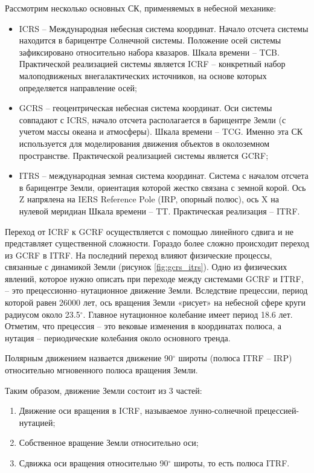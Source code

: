 Рассмотрим несколько основных СК, применяемых в небесной механике:
\begin{itemize}
    \item ICRS -- Международная небесная система координат. Начало отсчета системы находится
    в барицентре Солнечной системы. Положение осей системы зафиксировано относительно набора
    квазаров. Шкала времени -- TСB. Практической реализацией системы является ICRF -- конкретный набор
    малоподвиженых внегалактических источников, на основе которых определяется направление осей;
    \item GCRS -- геоцентрическая небесная система координат.
    Оси системы совпадают с ICRS, 
    начало отсчета располагается в барицентре Земли (с учетом массы океана и атмосферы).
    Шкала времени -- TCG. 
    Именно эта СК используется
    для моделирования движения объектов в околоземном пространстве.
    Практической реализацией системы является GCRF;
    \item ITRS -- международная земная система координат. Система с началом отсчета в барицентре Земли, ориентация которой
    жестко связана с земной корой. Ось Z напрялена на IERS Reference Pole (IRP, опорный полюс), ось X на нулевой меридиан Шкала времени -- TT.
    Практическая реализация -- ITRF.
\end{itemize}

Переход от ICRF к GCRF осуществляется с помощью линейного сдвига и не представляет
существенной сложности. Гораздо более сложно происходит переход из GCRF в ITRF.
На последний переход влияют физические процессы, связанные с динамикой Земли
(рисунок \ref{fig:gcrs_itrs}).
Одно из физических явлений, которое нужно описать при переходе между системами GCRF и
ITRF, -- это прецессионно--нутационное движение Земли. Вследствие прецессии, период которой
равен 26000 лет, ось вращения Земли «рисует» на небесной сфере круги радиусом
около 23.5$^\circ$. Главное нутационное колебание имеет период 18.6 лет.
Отметим, что прецессия -- это вековые изменения в координатах полюса, 
а нутация -- периодические колебания около основного тренда.

Полярным движением назвается движение 90$^\circ$ широты (полюса ITRF -- IRP)
относительно мгновенного полюса вращения Земли.

Таким образом, движение Земли состоит из 3 частей:
\begin{enumerate}
    \item Движение оси вращения в ICRF, называемое лунно-солнечной прецессией-нутацией;
    \item Собственное вращение Земли относительно оси;
    \item Сдвижка оси вращения относительно 90$^\circ$ широты, то есть полюса ITRF.
\end{enumerate}

